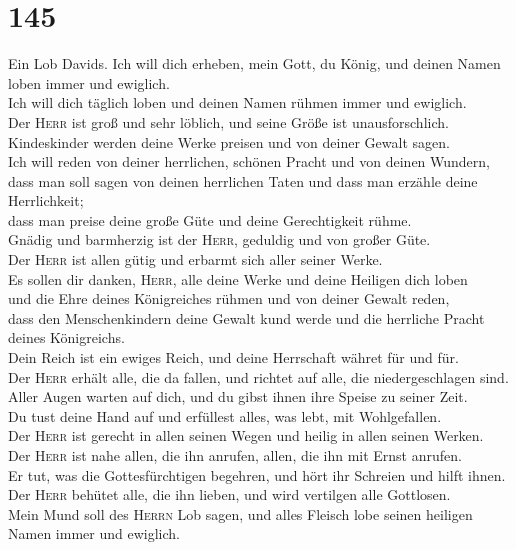 \hypertarget{section-144}{%
\section{145}\label{section-144}}

 Ein Lob Davids. Ich will dich erheben, mein Gott, du
König, und deinen Namen loben immer und ewiglich.\\
 Ich will dich täglich loben und deinen Namen rühmen immer
und ewiglich.\\
 Der \textsc{Herr} ist groß und sehr löblich, und seine
Größe ist unausforschlich.\\
 Kindeskinder werden deine Werke preisen und von deiner
Gewalt sagen.\\
 Ich will reden von deiner herrlichen, schönen Pracht und
von deinen Wundern,\\
 dass man soll sagen von deinen herrlichen Taten und dass
man erzähle deine Herrlichkeit;\\
 dass man preise deine große Güte und deine Gerechtigkeit
rühme.\\
 Gnädig und barmherzig ist der \textsc{Herr}, geduldig und
von großer Güte.\\
 Der \textsc{Herr} ist allen gütig und erbarmt sich aller
seiner Werke.\\
 Es sollen dir danken, \textsc{Herr}, alle deine Werke
und deine Heiligen dich loben\\
 und die Ehre deines Königreiches rühmen und von deiner
Gewalt reden,\\
 dass den Menschenkindern deine Gewalt kund werde und die
herrliche Pracht deines Königreichs.\\
 Dein Reich ist ein ewiges Reich, und deine Herrschaft
währet für und für.\\
 Der \textsc{Herr} erhält alle, die da fallen, und
richtet auf alle, die niedergeschlagen sind.\\
 Aller Augen warten auf dich, und du gibst ihnen ihre
Speise zu seiner Zeit.\\
 Du tust deine Hand auf und erfüllest alles, was lebt,
mit Wohlgefallen.\\
 Der \textsc{Herr} ist gerecht in allen seinen Wegen und
heilig in allen seinen Werken.\\
 Der \textsc{Herr} ist nahe allen, die ihn anrufen,
allen, die ihn mit Ernst anrufen.\\
 Er tut, was die Gottesfürchtigen begehren, und hört ihr
Schreien und hilft ihnen.\\
 Der \textsc{Herr} behütet alle, die ihn lieben, und wird
vertilgen alle Gottlosen.\\
 Mein Mund soll des \textsc{Herrn} Lob sagen, und alles
Fleisch lobe seinen heiligen Namen immer und ewiglich.

